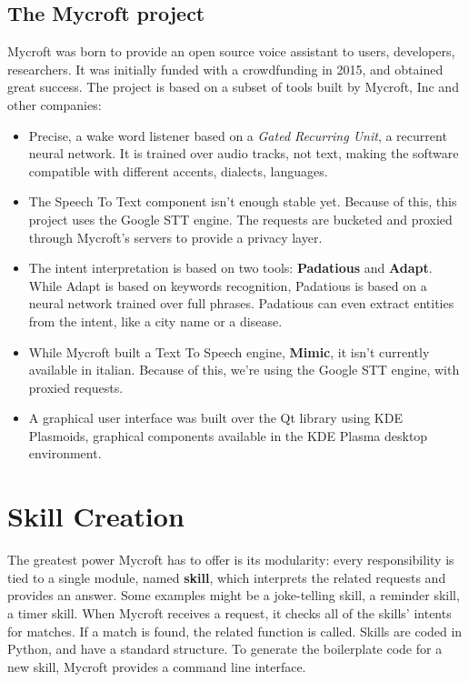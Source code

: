 \documentclass[conference]{IEEEtran}
\begin{document}
\subsection{The Mycroft project}
Mycroft was born to provide an open source voice assistant to users, developers, researchers. It was initially funded with a crowdfunding in 2015, and obtained great success. The project is based on a subset of tools built by Mycroft, Inc and other companies:
\begin{itemize}
    \item Precise, a wake word listener based on a \textit{Gated Recurring Unit}, a recurrent neural network. It is trained over audio tracks, not text, making the software compatible with different accents, dialects, languages.
    \item The Speech To Text component isn't enough stable yet. Because of this, this project uses the Google STT engine. The requests are bucketed and proxied through Mycroft's servers to provide a privacy layer.
    \item The intent interpretation is based on two tools: \textbf{Padatious} and \textbf{Adapt}. While Adapt is based on keywords recognition, Padatious is based on a neural network trained over full phrases. Padatious can even extract entities from the intent, like a city name or a disease.
    \item While Mycroft built a Text To Speech engine, \textbf{Mimic}, it isn't currently available in italian. Because of this, we're using the Google STT engine, with proxied requests.
    \item A graphical user interface was built over the Qt library using KDE Plasmoids, graphical components available in the KDE Plasma desktop environment.
\end{itemize}
\section{Skill Creation}
\label{sec:skill-creation}
The greatest power Mycroft has to offer is its modularity: every responsibility is tied to a single module, named \textbf{skill}, which interprets the related requests and provides an answer. Some examples might be a joke-telling skill, a reminder skill, a timer skill. When Mycroft receives a request, it checks all of the skills' intents for matches. If a match is found, the related function is called.
Skills are coded in Python, and have a standard structure. To generate the boilerplate code for a new skill, Mycroft provides a command line interface.
\end{document}
